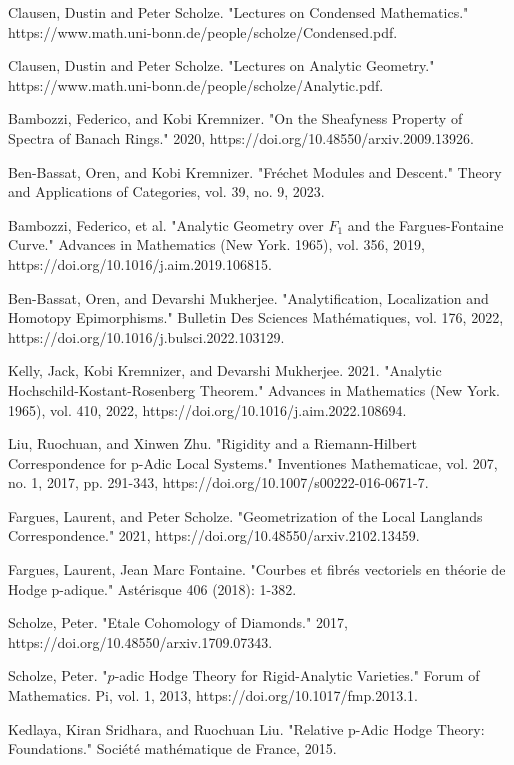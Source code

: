 \documentclass[12pt]{book}
\theoremstyle{definition}
\begin{document}
\begin{thebibliography}{}
 Clausen, Dustin and Peter Scholze. "Lectures on Condensed Mathematics." https://www.math.uni-bonn.de/people/scholze/Condensed.pdf. 

 Clausen, Dustin and Peter Scholze. "Lectures on Analytic Geometry." https://www.math.uni-bonn.de/people/scholze/Analytic.pdf.
 
 Bambozzi, Federico, and Kobi Kremnizer. "On the Sheafyness Property of Spectra of Banach Rings." 2020, https://doi.org/10.48550/arxiv.2009.13926.

 Ben-Bassat, Oren, and Kobi Kremnizer. "Fr\'echet Modules and Descent." Theory and Applications of Categories, vol. 39, no. 9, 2023.

 Bambozzi, Federico, et al. "Analytic Geometry over $F_1$ and the Fargues-Fontaine Curve." Advances in Mathematics (New York. 1965), vol. 356, 2019, https://doi.org/10.1016/j.aim.2019.106815.

 Ben-Bassat, Oren, and Devarshi Mukherjee. "Analytification, Localization and Homotopy Epimorphisms." Bulletin Des Sciences Math\'ematiques, vol. 176, 2022, https://doi.org/10.1016/j.bulsci.2022.103129.

 Kelly, Jack, Kobi Kremnizer, and Devarshi Mukherjee. 2021. "Analytic Hochschild-Kostant-Rosenberg Theorem." Advances in Mathematics (New York. 1965), vol. 410, 2022, https://doi.org/10.1016/j.aim.2022.108694.

 Liu, Ruochuan, and Xinwen Zhu. "Rigidity and a Riemann-Hilbert Correspondence for p-Adic Local Systems." Inventiones Mathematicae, vol. 207, no. 1, 2017, pp. 291-343, https://doi.org/10.1007/s00222-016-0671-7.

 Fargues, Laurent, and Peter Scholze. "Geometrization of the Local Langlands Correspondence." 2021, https://doi.org/10.48550/arxiv.2102.13459.
 
 Fargues, Laurent, Jean Marc Fontaine. "Courbes et fibr\'es vectoriels en th\'eorie de Hodge p-adique." Ast\'erisque 406 (2018): 1-382.

 Scholze, Peter. "Etale Cohomology of Diamonds." 2017, https://doi.org/10.48550/arxiv.1709.07343.

 Scholze, Peter. "$p$-adic Hodge Theory for Rigid-Analytic Varieties." Forum of Mathematics. Pi, vol. 1, 2013, https://doi.org/10.1017/fmp.2013.1.

 Kedlaya, Kiran Sridhara, and Ruochuan Liu. "Relative p-Adic Hodge Theory: Foundations." Soci\'et\'e math\'ematique de France, 2015.


\end{thebibliography}
\end{document}
